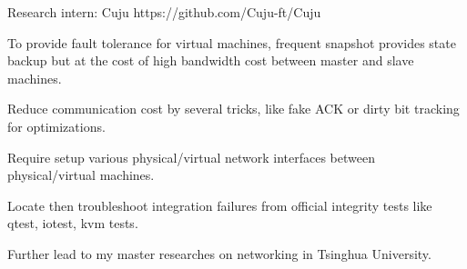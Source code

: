 
\vspace{-2mm}

\begin{cventries}

  
\cventry
  {} %
  {Research intern: Cuju} %
  {} %
  {https://github.com\linebreak/Cuju-ft/Cuju} %
  {
    \vspace{-2mm}
    \begin{cvitems} %
      \item {To provide fault tolerance for virtual machines, frequent snapshot provides state backup but at the cost of high
      bandwidth cost between master and slave machines.}
      \item {Reduce communication cost by several tricks, like fake ACK or dirty bit tracking for optimizations.}
      \item {Require setup various physical/virtual network interfaces between physical/virtual machines.}
      \item {Locate then troubleshoot integration failures from official integrity tests like qtest, iotest, kvm tests.}
      \item {Further lead to my master researches on networking in Tsinghua University.}
    \end{cvitems}
  }

  \vspace{-3mm}


\end{cventries}
